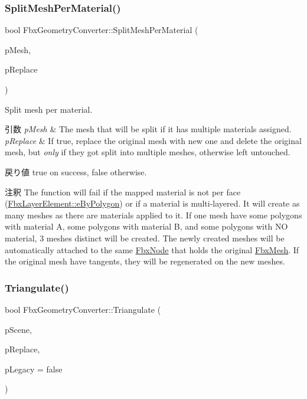 \subsubsection{\texorpdfstring{Split\+Mesh\+Per\+Material()}{SplitMeshPerMaterial()}}
{\footnotesize\ttfamily bool Fbx\+Geometry\+Converter\+::\+Split\+Mesh\+Per\+Material (\begin{DoxyParamCaption}\item[{\hyperlink{class_fbx_mesh}{Fbx\+Mesh} $\ast$}]{p\+Mesh,  }\item[{bool}]{p\+Replace }\end{DoxyParamCaption})}

Split mesh per material. 
\begin{DoxyParams}{引数}
{\em p\+Mesh} & The mesh that will be split if it has multiple materials assigned. \\
\hline
{\em p\+Replace} & If {\ttfamily true}, replace the original mesh with new one and delete the original mesh, but {\itshape only} if they got split into multiple meshes, otherwise left untouched. \\
\hline
\end{DoxyParams}
\begin{DoxyReturn}{戻り値}
{\ttfamily true} on success, {\ttfamily false} otherwise. 
\end{DoxyReturn}
\begin{DoxyRemark}{注釈}
The function will fail if the mapped material is not per face (\hyperlink{class_fbx_layer_element_a5a40e95db30ae9f94611dc3f1568af26a228dc5a768f2137313858ce986cba4cf}{Fbx\+Layer\+Element\+::e\+By\+Polygon}) or if a material is multi-\/layered. It will create as many meshes as there are materials applied to it. If one mesh have some polygons with material A, some polygons with material B, and some polygons with NO material, 3 meshes distinct will be created. The newly created meshes will be automatically attached to the same \hyperlink{class_fbx_node}{Fbx\+Node} that holds the original \hyperlink{class_fbx_mesh}{Fbx\+Mesh}. If the original mesh have tangents, they will be regenerated on the new meshes. 
\end{DoxyRemark}
\mbox{\label{class_fbx_geometry_converter_a472eeb2876199b239ce84807a5b4812b}} 
\subsubsection{\texorpdfstring{Triangulate()}{Triangulate()}\hspace{0.1cm}{\footnotesize\ttfamily [1/2]}}
{\footnotesize\ttfamily bool Fbx\+Geometry\+Converter\+::\+Triangulate (\begin{DoxyParamCaption}\item[{\hyperlink{class_fbx_scene}{Fbx\+Scene} $\ast$}]{p\+Scene,  }\item[{bool}]{p\+Replace,  }\item[{bool}]{p\+Legacy = {\ttfamily false} }\end{DoxyParamCaption})}

